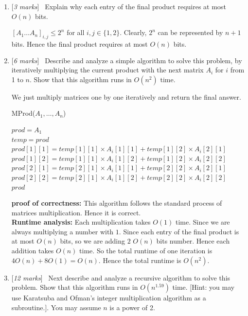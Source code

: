 \documentclass[11pt]{article}
\newcommand{\Q}[1]{\medskip\item {[{\em #1 marks\/}]}\ }
\begin{document}
\begin{enumerate}
\begin{enumerate}
\Q{3} Explain why each entry of the final product requires at most $O(n)$ bits.

$[A_1\ldots A_n]_{i,j} \leq 2^n$ for all $i, j \in \{1, 2\}$. Clearly, $2^n$ can be represented by $n + 1$ bits. 
Hence the final product requires at most $O(n)$ bits.

\Q{6} Describe and analyze a simple algorithm to solve this problem, by iteratively multiplying the current product with the next matrix $A_i$ for $i$ from 1 to $n$. Show that this algorithm runs in $O(n^2)$ time.

We just multiply matrices one by one iteratively and return the final answer.\\
\begin{algorithm} [h]
    \caption{MProd($A_1, \dots, A_n$)}
    $prod = A_1$\\
     {
        $temp = prod$\\
        $prod[1][1] = temp[1][1] \times A_i[1][1] + temp[1][2] \times A_i[2][1]$\\
        $prod[1][2] = temp[1][1] \times A_i[1][2] + temp[1][2] \times A_i[2][2]$\\
        $prod[2][1] = temp[2][1] \times A_i[1][1] + temp[2][2] \times A_i[2][1]$\\
        $prod[2][2] = temp[2][1] \times A_i[1][2] + temp[2][2] \times A_i[2][2]$\\
    }
    \Return $prod$
\end{algorithm}

\textbf{proof of correctness:} This algorithm follows the standard process of matrices multiplication. Hence 
it is correct.\\
\textbf{Runtime analysis:} Each multiplication takes $O(1)$ time. Since we are always multiplying a number with 
$1$. Since each entry of the final product is at most $O(n)$ bits, so we are adding $2$ $O(n)$ bits number. 
Hence each addition takes $O(n)$ time. So the total runtime of one iteration is $4 O(n) + 8 O(1) = O(n)$. 
Hence the total runtime is $O(n^2)$.

\newpage
\Q{12} Next describe and analyze a recursive algorithm to solve this problem. Show that this algorithm runs in $O(n^{1.59})$ time. [Hint: you may use Karatsuba and Ofman's integer multiplication algorithm as a subroutine.]. You may assume $n$ is a power of 2.


\end{enumerate}
\end{enumerate}
\end{document}
